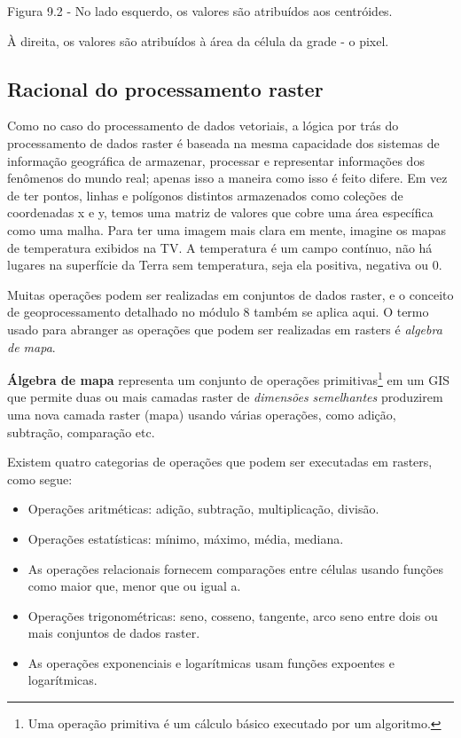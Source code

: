 \documentclass[
]{book}
\providecommand{\tightlist}{%
  \setlength{\itemsep}{0pt}\setlength{\parskip}{0pt}}
\begin{document}
Figura 9.2 - No lado esquerdo, os valores são atribuídos aos centróides.

À direita, os valores são atribuídos à área da célula da grade - o pixel.

\hypertarget{racional-do-processamento-raster}{%
\subsection{Racional do processamento raster}\label{racional-do-processamento-raster}}

Como no caso do processamento de dados vetoriais, a lógica por trás do processamento de dados raster é baseada na mesma capacidade dos sistemas de informação geográfica de armazenar, processar e representar informações dos fenômenos do mundo real; apenas isso a maneira como isso é feito difere. Em vez de ter pontos, linhas e polígonos distintos armazenados como coleções de coordenadas x e y, temos uma matriz de valores que cobre uma área específica como uma malha. Para ter uma imagem mais clara em mente, imagine os mapas de temperatura exibidos na TV. A temperatura é um campo contínuo, não há lugares na superfície da Terra sem temperatura, seja ela positiva, negativa ou 0.

Muitas operações podem ser realizadas em conjuntos de dados raster, e o conceito de geoprocessamento detalhado no módulo 8 também se aplica aqui. O termo usado para abranger as operações que podem ser realizadas em rasters é \emph{algebra de mapa}.

\textbf{Álgebra de mapa} representa um conjunto de operações primitivas\footnote{Uma operação primitiva é um cálculo básico executado por um algoritmo.} em um GIS que permite duas ou mais camadas raster de \emph{dimensões semelhantes} produzirem uma nova camada raster (mapa) usando várias operações, como adição, subtração, comparação etc.

Existem quatro categorias de operações que podem ser executadas em rasters, como segue:

\begin{itemize}
\tightlist
\item
  Operações aritméticas: adição, subtração, multiplicação, divisão.
\item
  Operações estatísticas: mínimo, máximo, média, mediana.
\item
  As operações relacionais fornecem comparações entre células usando funções como maior que, menor que ou igual a.
\item
  Operações trigonométricas: seno, cosseno, tangente, arco seno entre dois ou mais conjuntos de dados raster.
\item
  As operações exponenciais e logarítmicas usam funções expoentes e logarítmicas.
\end{itemize}
\end{document}
